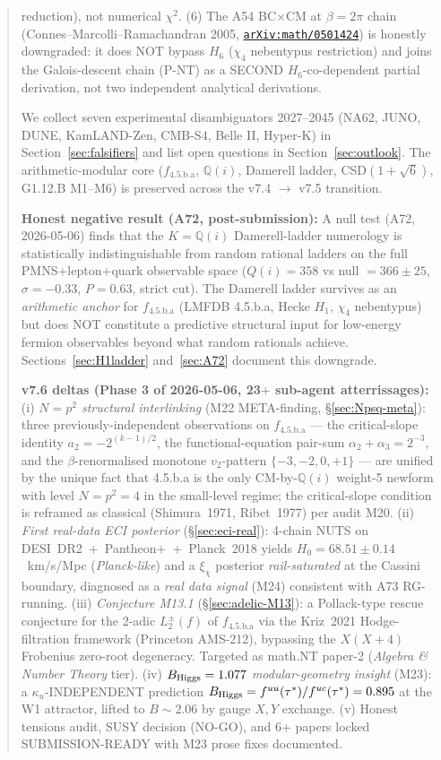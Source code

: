 \documentclass[a4paper,11pt]{article}
\newcommand{\arXiv}[1]{\href{https://arxiv.org/abs/#1}{\texttt{arXiv:#1}}}
\newcommand{\fLM}{f_{\text{4.5.b.a}}}
\newcommand{\Qi}{\mathbb{Q}(i)}
\theoremstyle{definition}
\theoremstyle{remark}
\begin{document}
\begin{abstract}
reduction), not numerical $\chi^2$.  (6) The A54 BC$\times$CM at
$\beta=2\pi$ chain (Connes--Marcolli--Ramachandran 2005,
\arXiv{math/0501424}) is honestly downgraded: it does NOT bypass
$H_6$ ($\chi_4$ nebentypus restriction) and joins the Galois-descent
chain (P-NT) as a SECOND $H_6$-co-dependent partial derivation,
not two independent analytical derivations.
\par
We collect seven experimental disambiguators 2027--2045 (NA62,
JUNO, DUNE, KamLAND-Zen, CMB-S4, Belle II, Hyper-K) in
Section~\ref{sec:falsifiers} and list open questions in
Section~\ref{sec:outlook}.  The arithmetic-modular core
($\fLM$, $\Qi$, Damerell ladder, CSD$(1+\sqrt 6)$, G1.12.B M1--M6)
is preserved across the v7.4 $\to$ v7.5 transition.
\par
\textbf{Honest negative result (A72, post-submission):}
A null test (A72, 2026-05-06) finds that the $K=\Qi$ Damerell-ladder
numerology is statistically indistinguishable from random rational ladders
on the full PMNS$+$lepton$+$quark observable space ($Q(i)=358$ vs
null $=366\pm25$, $\sigma=-0.33$, $P=0.63$, strict cut).  The Damerell
ladder survives as an \emph{arithmetic anchor} for $\fLM$ (LMFDB
4.5.b.a, Hecke $H_1$, $\chi_4$ nebentypus) but does NOT constitute
a predictive structural input for low-energy fermion observables
beyond what random rationals achieve.  Sections~\ref{sec:H1ladder}
and~\ref{sec:A72} document this downgrade.
\par
\textbf{v7.6 deltas (Phase 3 of 2026-05-06, 23$+$ sub-agent atterrissages):}
(i) \emph{$N=p^{2}$ structural interlinking} (M22 META-finding,
\S\ref{sec:Npsq-meta}): three previously-independent observations on
$\fLM$ ---  the critical-slope identity $a_2=-2^{(k-1)/2}$, the
functional-equation pair-sum $\alpha_2+\alpha_3=2^{-3}$, and the
$\beta$-renormalised monotone $v_2$-pattern $\{-3,-2,0,+1\}$ --- are
unified by the unique fact that 4.5.b.a is the only CM-by-$\Qi$
weight-5 newform with level $N=p^2=4$ in the small-level regime;
the critical-slope condition is reframed as classical
(Shimura~1971, Ribet~1977) per audit M20.
(ii) \emph{First real-data ECI posterior} (\S\ref{sec:eci-real}):
4-chain NUTS on DESI~DR2~+~Pantheon$+$~+~Planck~2018 yields
$H_0 = 68.51\pm 0.14$~km/s/Mpc (\emph{Planck-like}) and a
$\xi_\chi$ posterior \emph{rail-saturated} at the Cassini boundary,
diagnosed as a \emph{real data signal} (M24) consistent with
A73 RG-running.
(iii) \emph{Conjecture M13.1} (\S\ref{sec:adelic-M13}):
a Pollack-type rescue conjecture for the 2-adic $L^{\pm}_2(f)$ of
$\fLM$ via the Kriz~2021 Hodge-filtration framework
(Princeton AMS-212), bypassing the $X(X+4)$ Frobenius zero-root
degeneracy.  Targeted as math.NT paper-2 (\emph{Algebra \&
Number Theory} tier).
(iv) \emph{$B_{\rm Higgs}=1.077$ modular-geometry insight} (M23):
a $\kappa_u$-INDEPENDENT prediction
$B_{\rm Higgs}=f^{uu}(\tau^{*})/f^{uc}(\tau^{*})=0.895$ at the W1
attractor, lifted to $B\sim 2.06$ by gauge $X,Y$ exchange.
(v) Honest tensions audit, SUSY decision (NO-GO), and 6$+$ papers
locked SUBMISSION-READY with M23 prose fixes documented.
\end{abstract}
\end{document}
